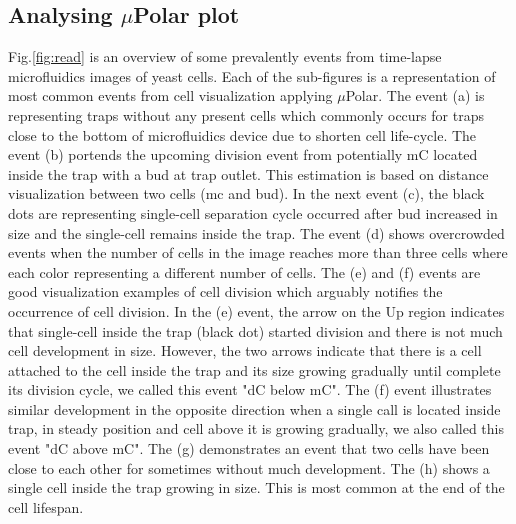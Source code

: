 \documentclass[conference]{IEEEtran}
\begin{document}
\subsection{Analysing $\mu$Polar plot}

Fig.\ref{fig:read} is an overview of some prevalently events from time-lapse microfluidics images of yeast cells. Each of the sub-figures is a representation of most common events from cell  visualization applying $\mu$Polar. The event (a) is representing traps without any present cells which commonly occurs for traps close to the bottom of microfluidics device due to shorten cell life-cycle. The event (b) portends the upcoming division event from potentially mC located inside the trap with a bud at trap outlet. This estimation is based on distance visualization between two cells (mc and bud). In the next event (c), the black dots are representing single-cell separation cycle occurred after bud increased in size and the single-cell remains inside the trap. The event (d) shows overcrowded events when the number of cells in the image reaches more than three cells where each color representing a different number of cells. The (e) and (f) events are good visualization examples of cell division which arguably notifies the occurrence of cell division. In the (e) event, the arrow on the Up region indicates that single-cell inside the trap (black dot) started division and there is not much cell development in size. However, the two arrows indicate that there is a cell attached to the cell inside the trap and its size growing gradually until complete its division cycle, we called this event "dC below mC". The (f) event illustrates similar development in the opposite direction when a single call is located inside trap, in steady position and cell above it is growing gradually, we also called this event "dC above mC". The (g) demonstrates an event that two cells have been close to each other for sometimes without much development. The (h) shows a single cell inside the trap growing in size. This is most common at the end of the cell lifespan.
\end{document}
